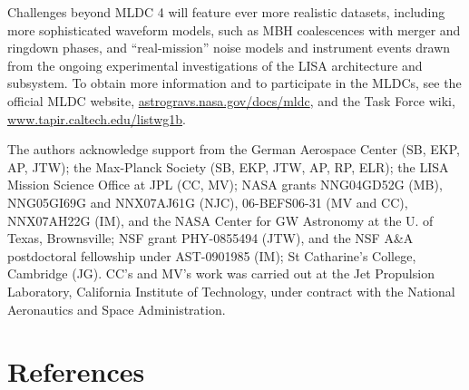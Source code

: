 \documentclass{iopart}
\begin{document}
Challenges beyond MLDC 4 will feature ever more realistic datasets, including more sophisticated waveform models, such as MBH coalescences with merger and ringdown phases, and ``real-mission'' noise models and instrument events drawn from the ongoing experimental investigations of the LISA architecture and subsystem. To obtain more information and to participate in the MLDCs, see the official MLDC website, \url{astrogravs.nasa.gov/docs/mldc}, and the Task Force wiki, \url{www.tapir.caltech.edu/listwg1b}.

\ack
The authors acknowledge support from
the German Aerospace Center (SB, EKP, AP, JTW);
the Max-Planck Society (SB, EKP, JTW, AP, RP, ELR);
the LISA Mission Science Office at JPL (CC, MV);
NASA grants NNG04GD52G (MB),
  NNG05GI69G and NNX07AJ61G (NJC),
  06-BEFS06-31 (MV and CC),
  NNX07AH22G (IM),
  and the NASA Center for GW Astronomy at the U. of Texas, Brownsville;
NSF grant PHY-0855494 (JTW),
  and the NSF A\&A postdoctoral fellowship under AST-0901985 (IM);
St Catharine's College, Cambridge (JG).
CC's and MV's work was carried out at the Jet Propulsion Laboratory, California Institute of Technology, under contract with the National Aeronautics and Space Administration.

\section*{References}
\end{document}
